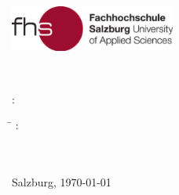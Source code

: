 \begin{titlepage}
\begin{center}
\Huge{
	{\textbf{\titlecap \ipapertype}}
}
\end{center}
\newpage

\thispagestyle{empty}

\hfill \includegraphics[height=1.5cm]{images/FHSLogo.pdf}

\vspace*{2cm}

\Large{
\MakeUppercase\ititletwo

\vspace*{1cm}

\MakeSentenceCase{\ipapertypeger}~\tattainment

\vspace*{0.5cm}

\textit{\tdegree}
}


\vspace*{1.5cm}
{\large
\tauthor: \iauthor
}
\vfill

{\normalsize
\tsubmitted

\vspace*{1cm}

\begin{tabbing}
\hspace*{1.4in}\=\kill
\texamined: \> \\ 
\isupervisorone \\
\isupervisortwo \\
\end{tabbing}

\vfill
{}
Salzburg, \today
{}
}
\end{titlepage}